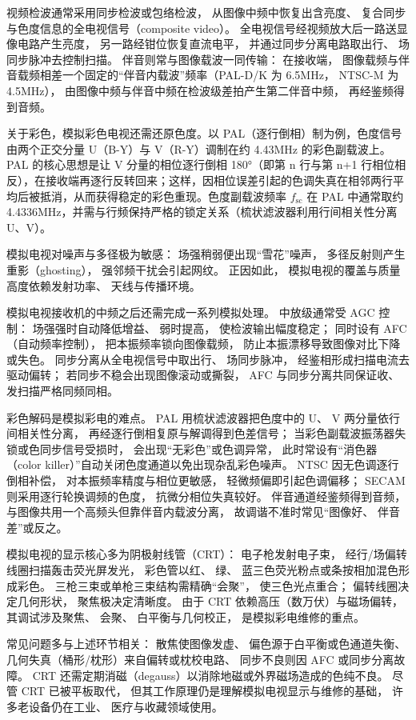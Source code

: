 视频检波通常采用同步检波或包络检波，
从图像中频中恢复出含亮度、
复合同步与色度信息的全电视信号（composite video）。
全电视信号经视频放大后一路送显像电路产生亮度，
另一路经钳位恢复直流电平，
并通过同步分离电路取出行、
场同步脉冲去控制扫描。
伴音则常与图像载波一同传输：
在接收端，
图像载频与伴音载频相差一个固定的“伴音内载波”频率（PAL-D/K 为 6.5MHz，
NTSC-M 为 4.5MHz），
由图像中频与伴音中频在检波级差拍产生第二伴音中频，
再经鉴频得到音频。

关于彩色，模拟彩色电视还需还原色度。以 PAL（逐行倒相）制为例，色度信号由两个正交分量 U（B-Y）与 V（R-Y）调制在约 4.43MHz 的彩色副载波上。PAL 的核心思想是让 V 分量的相位逐行倒相 180°（即第 n 行与第 n+1 行相位相反），在接收端再逐行反转回来；这样，因相位误差引起的色调失真在相邻两行平均后被抵消，从而获得稳定的彩色重现。色度副载波频率 $f_{\mathrm{sc}}$ 在 PAL 中通常取约 4.4336MHz，并需与行频保持严格的锁定关系（梳状滤波器利用行间相关性分离 U、V）。

模拟电视对噪声与多径极为敏感：
场强稍弱便出现“雪花”噪声，
多径反射则产生重影（ghosting），
强邻频干扰会引起网纹。
正因如此，
模拟电视的覆盖与质量高度依赖发射功率、
天线与传播环境。

模拟电视接收机的中频之后还需完成一系列模拟处理。
中放级通常受 AGC 控制：
场强强时自动降低增益、
弱时提高，
使检波输出幅度稳定；
同时设有 AFC（自动频率控制），
把本振频率锁向图像载频，
防止本振漂移导致图像对比下降或失色。
同步分离从全电视信号中取出行、
场同步脉冲，
经鉴相形成扫描电流去驱动偏转；
若同步不稳会出现图像滚动或撕裂，
AFC 与同步分离共同保证收、
发扫描严格同频同相。

彩色解码是模拟彩电的难点。
PAL 用梳状滤波器把色度中的 U、
V 两分量依行间相关性分离，
再经逐行倒相复原与解调得到色差信号；
当彩色副载波振荡器失锁或色同步信号受损时，
会出现“无彩色”或色调异常，
此时常设有“消色器（color killer）”自动关闭色度通道以免出现杂乱彩色噪声。
NTSC 因无色调逐行倒相补偿，
对本振频率精度与相位更敏感，
轻微频偏即引起色调偏移；
SECAM 则采用逐行轮换调频的色度，
抗微分相位失真较好。
伴音通道经鉴频得到音频，
与图像共用一个高频头但靠伴音内载波分离，
故调谐不准时常见“图像好、
伴音差”或反之。

模拟电视的显示核心多为阴极射线管（CRT）：
电子枪发射电子束，
经行/场偏转线圈扫描轰击荧光屏发光，
彩色管以红、
绿、
蓝三色荧光粉点或条按相加混色形成彩色。
三枪三束或单枪三束结构需精确“会聚”，
使三色光点重合；
偏转线圈决定几何形状，
聚焦极决定清晰度。
由于 CRT 依赖高压（数万伏）与磁场偏转，
其调试涉及聚焦、
会聚、
白平衡与几何校正，
是模拟彩电维修的重点。

常见问题多与上述环节相关：
散焦使图像发虚、
偏色源于白平衡或色通道失衡、
几何失真（桶形/枕形）来自偏转或枕校电路、
同步不良则因 AFC 或同步分离故障。
CRT 还需定期消磁（degauss）以消除地磁或外界磁场造成的色纯不良。
尽管 CRT 已被平板取代，
但其工作原理仍是理解模拟电视显示与维修的基础，
许多老设备仍在工业、
医疗与收藏领域使用。

